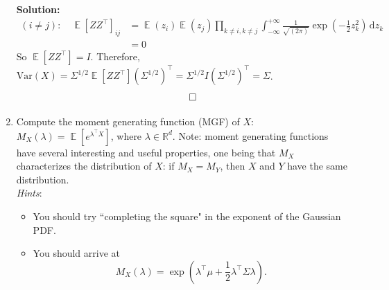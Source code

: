 \documentclass{article}
\DeclareMathOperator{\E}{\mathbb{E}}
\newenvironment{solution}{\color{blue} \smallskip \textbf{Solution:}}{}
\begin{document}
\begin{enumerate}
\begin{solution}
        \begin{align*}
        (i \neq j) : \quad         
        \E[ZZ^\top]_{ij}&= \E(z_i) \E(z_j) \prod_{k \neq i, k \neq j}\int_{-\infty}^{+\infty} \frac{1}{\sqrt{(2\pi)}} \exp\left(-\frac{1}{2} z^2_k\right) \,\mathrm dz_k \\
        &= 0
        \end{align*}
        So $\E[ZZ^\top] = I$. Therefore, $\mathrm{Var}(X)=\Sigma^{1/2}\E[ZZ^\top](\Sigma^{1/2})^\top=\Sigma^{1/2}I(\Sigma^{1/2})^\top=\Sigma$.
        \[ \qedhere \]
        
    \end{solution}

    \item
    Compute the moment generating function (MGF) of $X$: $M_X(\lambda) = \E[e^{\lambda^\top X}]$, where $\lambda \in \mathbb R^d$. 
    Note: moment generating functions have several interesting and useful properties, one being that $M_X$ characterizes the distribution of $X$: if $M_X = M_Y$, then $X$ and $Y$ have the same distribution.\\
    \emph{Hints}:
    \begin{itemize}
        \item You should try ``completing the square" in the exponent of the Gaussian PDF.
        \item You should arrive at 
        \[
            M_X(\lambda) = \exp\left(\lambda^\top\mu + \frac12 \lambda^\top\Sigma\lambda\right).
        \]
    \end{itemize}


\end{enumerate}
\end{document}
